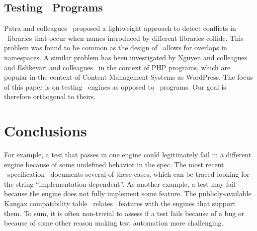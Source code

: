 \documentclass[10pt,conference,anonymous]{IEEEtran}
\begin{document}
\subsection{Testing \js\ Programs}
Patra and colleagues~\cite{Patra:2018:CFU:3180155.3180184} proposed a
lightweight approach to detect conflicts in \js\ libraries that occur
when names introduced by different libraries collide. This problem was
found to be common as the design of \js\ allows for overlaps in
namespaces. A similar problem has been investigated by Nguyen and
colleagues~\cite{nguyen-etal-icse2014} and Eshkevari and
colleagues~\cite{eshkevari-etal-icpc2014} in the context of PHP
programs, which are popular in the context of Content Management
Systems as WordPress. The focus of this paper is on testing
\js\ engines as opposed to \js\ programs. Our goal is therefore
orthogonal to theirs.

\section{Conclusions}

For example, a test that passes in one engine could
legitimately fail in a different engine because of some undefined
behavior in the spec. The most recent
\js\ specification~\cite{ecmas262-spec} documents several of these
cases, which can be traced looking for the string ``implementation-dependent''. As another example, a test
may fail because the engine does not fully implement some feature. The
publicly-available Kangax compatibility table~\cite{kangax} relates
\js\ features with the engines that support them. To sum, it is often
non-trivial to assess if a test fails because of a bug or because of
some other reason making test automation more challenging. 



%
\balance


\end{document}
